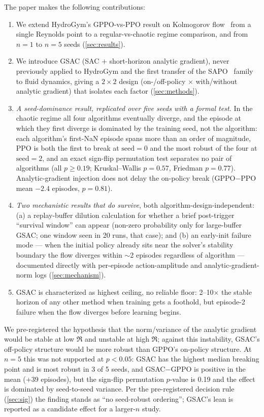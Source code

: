 The paper makes the following contributions:
\begin{enumerate}
  \item We extend HydroGym's GPPO-vs-PPO result on Kolmogorov
  flow~\cite{hydrogym2026} from a single Reynolds point to a
  regular-vs-chaotic regime comparison, and from $n=1$ to $n=5$ seeds
  (\cref{sec:results}).
  \item We introduce GSAC (SAC $+$ short-horizon analytic
  gradient), never previously applied to HydroGym and the first transfer of
  the SAPO~\cite{sapo2025} family to fluid dynamics, giving a $2\times 2$
  design (on-/off-policy $\times$ with/without analytic gradient) that
  isolates each factor (\cref{sec:methods}).
  \item \emph{A seed-dominance result, replicated over five seeds with a
  formal test.} In the chaotic regime all four algorithms eventually
  diverge, and the episode at which they first diverge is dominated by the
  training seed, not the algorithm: each algorithm's first-NaN episode spans
  more than an order of magnitude, PPO is both the first to break at
  $\text{seed}=0$ and the most robust of the four at $\text{seed}=2$, and an
  exact sign-flip permutation test separates no pair of algorithms (all
  $p\ge 0.19$; Kruskal--Wallis $p=0.57$, Friedman $p=0.77$).
  Analytic-gradient injection does not delay the on-policy break
  (GPPO$-$PPO mean $-2.4$ episodes, $p=0.81$).
  \item \emph{Two mechanistic results that do survive}, both
  algorithm-design-independent: (a) a replay-buffer dilution calculation for
  whether a brief post-trigger ``survival window'' can appear (non-zero
  probability only for large-buffer GSAC; one window seen in \num{20} runs,
  that case); and (b) an early-init failure mode --- when the initial policy
  already sits near the solver's stability boundary the flow diverges within
  $\sim$2 episodes regardless of algorithm --- documented directly with
  per-episode action-amplitude and analytic-gradient-norm logs
  (\cref{sec:mechanism}).
  \item GSAC is characterized as highest ceiling, no reliable
  floor: 2--10$\times$ the stable horizon of any other method when training
  gets a foothold, but episode-2 failure when the flow diverges before
  learning begins.
\end{enumerate}

We pre-registered the hypothesis that the norm/variance of the analytic
gradient would be stable at low $\Re$ and unstable at high $\Re$; against
this instability, GSAC's off-policy structure would be more robust than
GPPO's on-policy structure. At $n=5$ this was not supported at $p<0.05$:
GSAC has the highest median breaking point and is most robust in 3 of 5
seeds, and GSAC$-$GPPO is positive in the mean ($+39$ episodes), but the
sign-flip permutation $p$-value is \num{0.19} and the effect is dominated by
seed-to-seed variance. Per the pre-registered decision rule (\cref{sec:sig})
the finding stands as ``no seed-robust ordering''; GSAC's lean is reported
as a candidate effect for a larger-$n$ study.

